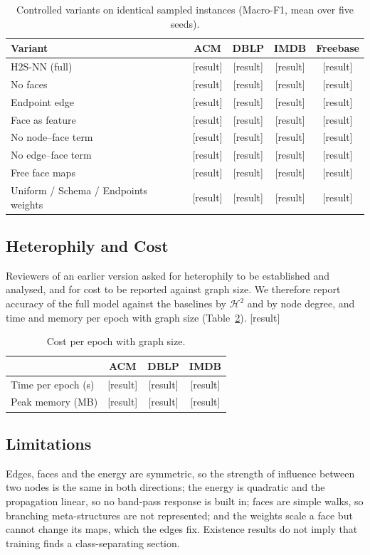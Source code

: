 \documentclass{article}
\newcommand{\method}{\textsc{H2S-NN}}
\newcommand{\res}{{\scriptsize[result]}}
\begin{document}
\begin{table}[t]
  \centering
  \caption{Controlled variants on identical sampled instances (Macro-F1, mean over five seeds).}
  \label{tab:ablation}
  \footnotesize
  \setlength{\tabcolsep}{3pt}
  \begin{tabular}{lcccc}
    \toprule
    \textbf{Variant} & ACM & DBLP & IMDB & Freebase \\
    \midrule
    \method{} (full) & \res & \res & \res & \res \\
    No faces & \res & \res & \res & \res \\
    Endpoint edge & \res & \res & \res & \res \\
    Face as feature & \res & \res & \res & \res \\
    No node--face term & \res & \res & \res & \res \\
    No edge--face term & \res & \res & \res & \res \\
    Free face maps & \res & \res & \res & \res \\
    Uniform / Schema / Endpoints weights & \res & \res & \res & \res \\
    \bottomrule
  \end{tabular}
\end{table}

\subsection{Heterophily and Cost}
Reviewers of an earlier version asked for heterophily to be established and analysed, and for cost to be reported against graph size. We therefore report accuracy of the full model against the baselines by $\mathcal{H}^2$ and by node degree, and time and memory per epoch with graph size (Table~\ref{tab:cost}). \res{}

\begin{table}[t]
  \centering
  \caption{Cost per epoch with graph size.}
  \label{tab:cost}
  \footnotesize
  \setlength{\tabcolsep}{4pt}
  \begin{tabular}{lccc}
    \toprule
    & ACM & DBLP & IMDB \\
    \midrule
    Time per epoch (s) & \res & \res & \res \\
    Peak memory (MB) & \res & \res & \res \\
    \bottomrule
  \end{tabular}
\end{table}

\subsection{Limitations}
Edges, faces and the energy are symmetric, so the strength of influence between two nodes is the same in both directions; the energy is quadratic and the propagation linear, so no band-pass response is built in; faces are simple walks, so branching meta-structures are not represented; and the weights scale a face but cannot change its maps, which the edges fix. Existence results do not imply that training finds a class-separating section.
\end{document}
